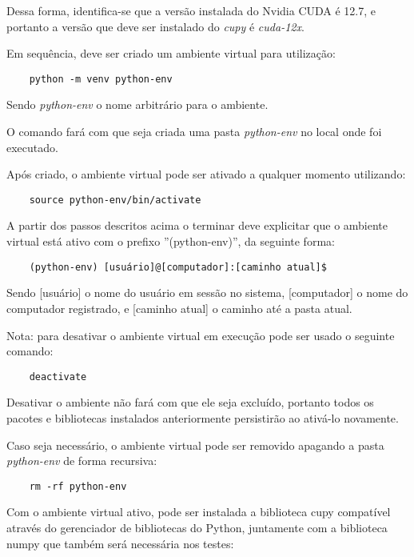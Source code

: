 \documentclass[12pt,a4paper]{article}
\begin{document}
Dessa forma, identifica-se que a versão instalada do Nvidia CUDA é 12.7, e portanto a versão que deve ser instalado do \emph{cupy} é \emph{cuda-12x}.

Em sequência, deve ser criado um ambiente virtual para utilização:

\begin{verbatim}
    python -m venv python-env
\end{verbatim}

Sendo \emph{python-env} o nome arbitrário para o ambiente.

O comando fará com que seja criada uma pasta \emph{python-env} no local onde foi executado.

Após criado, o ambiente virtual pode ser ativado a qualquer momento utilizando:

\begin{verbatim}
    source python-env/bin/activate
\end{verbatim}

A partir dos passos descritos acima o terminar deve explicitar que o ambiente virtual está ativo com o prefixo ''(python-env)'', da seguinte forma:

\begin{verbatim}
    (python-env) [usuário]@[computador]:[caminho atual]$
\end{verbatim}

Sendo [usuário] o nome do usuário em sessão no sistema, [computador] o nome do computador registrado, e [caminho atual] o caminho até a pasta atual.

Nota: para desativar o ambiente virtual em execução pode ser usado o seguinte comando:

\begin{verbatim}
    deactivate
\end{verbatim}

Desativar o ambiente não fará com que ele seja excluído, portanto todos os pacotes e bibliotecas instalados anteriormente persistirão ao ativá-lo novamente.

Caso seja necessário, o ambiente virtual pode ser removido apagando a pasta \emph{python-env} de forma recursiva:

\begin{verbatim}
    rm -rf python-env
\end{verbatim}

Com o ambiente virtual ativo, pode ser instalada a biblioteca cupy compatível através do gerenciador de bibliotecas do Python, juntamente com a biblioteca numpy que também será necessária nos testes:
\end{document}
